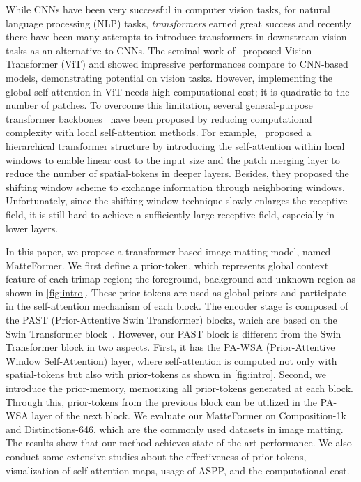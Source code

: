 \documentclass[10pt,twocolumn,letterpaper]{article}
\begin{document}
While CNNs have been very successful in computer vision tasks, for natural language processing (NLP) tasks, \textit{transformers} earned great success and recently there have been many attempts to introduce transformers in downstream vision tasks as an alternative to CNNs. The seminal work of~\cite{dosovitskiy2020image} proposed Vision Transformer (ViT) and showed impressive performances compare to CNN-based models, demonstrating potential on vision tasks.
However, implementing the global self-attention in ViT needs high computational cost; it is quadratic to the number of patches. To overcome this limitation, several general-purpose transformer backbones~\cite{liu2021swin, dong2021cswin, yang2021focal} have been proposed by reducing computational complexity with local self-attention methods.
For example,~\cite{liu2021swin} proposed a hierarchical transformer structure by introducing the self-attention within local windows to enable linear cost to the input size and the patch merging layer to reduce the number of spatial-tokens in deeper layers. Besides, they proposed the shifting window scheme to exchange information through neighboring windows.
Unfortunately, since the shifting window technique slowly enlarges the receptive field, it is still hard to achieve a sufficiently large receptive field, especially in lower layers.

In this paper, we propose a transformer-based image matting model, named MatteFormer.
We first define a prior-token, which represents global context feature of each trimap region; the foreground, background and unknown region as shown in \cref{fig:intro}.
These prior-tokens are used as global priors and participate in the self-attention mechanism of each block.
The encoder stage is composed of the PAST (Prior-Attentive Swin Transformer) blocks, which are based on the Swin Transformer block~\cite{liu2021swin}.
However, our PAST block is different from the Swin Transformer block in two aspects. First, it has the PA-WSA (Prior-Attentive Window Self-Attention) layer, where self-attention is computed not only with spatial-tokens but also with prior-tokens as shown in \cref{fig:intro}. 
Second, we introduce the prior-memory, memorizing all prior-tokens generated at each block. Through this, prior-tokens from the previous block can be utilized in the PA-WSA layer of the next block.
We evaluate our MatteFormer on Composition-1k and Distinctions-646, which are the commonly used datasets in image matting. The results show that our method achieves state-of-the-art performance.
We also conduct some extensive studies about the effectiveness of prior-tokens, visualization of self-attention maps, usage of ASPP, and the computational cost.
\end{document}
